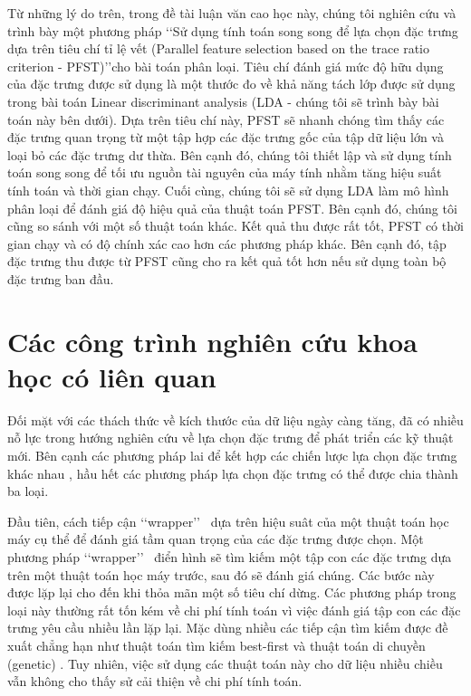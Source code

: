 Từ những lý do trên, trong đề tài luận văn cao học này, chúng tôi nghiên cứu và trình bày một phương pháp \lq\lq Sử dụng tính toán song song để lựa chọn đặc trưng dựa trên tiêu chí tỉ lệ vết (Parallel feature selection based on the trace ratio criterion - PFST)\rq\rq cho bài toán phân loại. Tiêu chí đánh giá mức độ hữu dụng của đặc trưng được sử dụng là một thước đo về khả năng tách lớp được sử dụng trong bài toán Linear discriminant analysis (LDA - chúng tôi sẽ trình bày bài toán này bên dưới). Dựa trên tiêu chí này, PFST sẽ nhanh chóng tìm thấy các đặc trưng quan trọng từ một tập hợp các đặc trưng gốc của tập dữ liệu lớn và loại bỏ các đặc trưng dư thừa. Bên cạnh đó, chúng tôi thiết lập và sử dụng tính toán song song để tối ưu nguồn tài nguyên của máy tính nhằm tăng hiệu suất tính toán và thời gian chạy. Cuối cùng, chúng tôi sẽ sử dụng LDA làm mô hình phân loại để đánh giá độ hiệu quả của thuật toán PFST. Bên cạnh đó, chúng tôi cũng so sánh với một số thuật toán khác. Kết quả thu được rất tốt, PFST có thời gian chạy và có độ chính xác cao hơn các phương pháp khác. Bên cạnh đó, tập đặc trưng thu được từ PFST cũng cho ra kết quả tốt hơn nếu sử dụng toàn bộ đặc trưng ban đầu.

\section{Các công trình nghiên cứu khoa học có liên quan}
Đối mặt với các thách thức về kích thước của dữ liệu ngày càng tăng, đã có nhiều nỗ lực trong hướng nghiên cứu về lựa chọn đặc trưng để phát triển các kỹ thuật mới. Bên cạnh các phương pháp lai để kết hợp các chiến lược lựa chọn đặc trưng khác nhau \cite{saeys2007review,ang2015supervised}, hầu hết các phương pháp lựa chọn đặc trưng có thể được chia thành ba loại.

Đầu tiên, cách tiếp cận \lq\lq wrapper\rq\rq~ dựa trên hiệu suât của một thuật toán học máy cụ thể để đánh giá tầm quan trọng của các đặc trưng được chọn. Một phương pháp \lq\lq wrapper\rq\rq~ điển hình sẽ tìm kiếm một tập con các đặc trưng dựa trên một thuật toán học máy trước, sau đó sẽ đánh giá chúng. Các bước này được lặp lại cho đến khi thỏa mãn một số tiêu chí dừng. Các phương pháp trong loại này thường rất tốn kém về chi phí tính toán vì việc đánh giá tập con các đặc trưng yêu cầu nhiều lần lặp lại. Mặc dùng nhiều các tiếp cận tìm kiếm được đề xuất chẳng hạn như thuật toán tìm kiếm best-first \cite{arai2016unsupervised} và thuật toán di chuyền (genetic) \cite{goldberg1988genetic}. Tuy nhiên, việc sử dụng các thuật toán này cho dữ liệu nhiều chiều vẫn không cho thấy sử cải thiện về chi phí tính toán.

